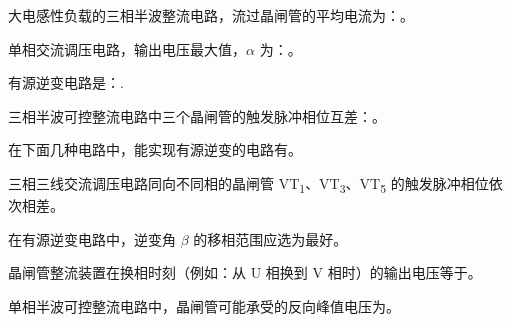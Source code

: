 \documentclass[电力电子]{subfiles}
\begin{document}
\begin{ti}
	大电感性负载的三相半波整流电路，流过晶闸管的平均电流为：。
\end{ti}

\begin{ti}
	单相交流调压电路，输出电压最大值，$\alpha$ 为：。
\end{ti}

\begin{ti}
	有源逆变电路是：.
\end{ti}

\begin{ti}
	三相半波可控整流电路中三个晶闸管的触发脉冲相位互差：。
\end{ti}

\begin{ti}
	在下面几种电路中，能实现有源逆变的电路有。
\end{ti}

\begin{ti}
	三相三线交流调压电路同向不同相的晶闸管 VT\textsubscript{1}、VT\textsubscript{3}、VT\textsubscript{5} 的触发脉冲相位依次相差。
\end{ti}

\begin{ti}
	在有源逆变电路中，逆变角 $\beta$ 的移相范围应选为最好。
\end{ti}

\begin{ti}
	晶闸管整流装置在换相时刻（例如：从 U 相换到 V 相时）的输出电压等于。
\end{ti}

\begin{ti}
	单相半波可控整流电路中，晶闸管可能承受的反向峰值电压为。
\end{ti}
\end{document}
